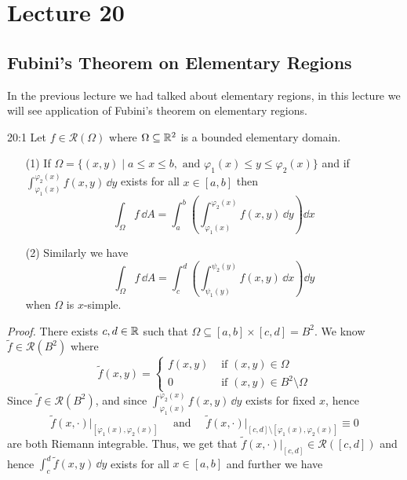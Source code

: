 \documentclass[../Analysis-3.tex]{subfiles}
\begin{document}
\chapter*{Lecture 20} %
\setcounter{chapter}{20} %
\setcounter{section}{0}

\section{Fubini's Theorem on Elementary Regions}

In the previous lecture we had talked about elementary regions, in this lecture we will see application of Fubini's theorem on elementary regions.

\begin{Thm}{}{20:1}
  Let $f \in \mathscr{R}(\Omega)$ where $\Omega \subseteq \mathbb{R}^2$ is a bounded elementary domain.
  \begin{enumerate}
    \item[(1)] If $\Omega = \{ (x,y) \mid a \leq x \leq b, \mbox{ and } \varphi_1(x) \leq y \leq \varphi_2(x) \}$ and if $\displaystyle{\int_{\varphi_1(x)}^{\varphi_2(x)}f(x,y) \, \dd
          y}$ exists for all $x \in [a,b]$ then
      \[
        \int_{\Omega} f \, \dd A = \int_a^b \left( \int_{\varphi_1(x)}^{\varphi_2(x)} f(x,y) \, \dd y\right) \dd x
      \]

    \item[(2)] Similarly we have
      \[
        \int_{\Omega} f \, \dd A = \int_c^d \left( \int_{\psi_1(y)}^{\psi_2(y)} f(x,y) \, \dd x\right) \dd y
      \]
      when $\Omega$ is $x$-simple.
  \end{enumerate}
\end{Thm}
\textit{Proof.} There exists $c,d \in \mathbb{R}$ such that $\Omega \subseteq [a,b] \times [c,d] = B^2$. We know $\tilde{f} \in \mathscr{R}(B^2)$ where
\[
  \tilde{f}(x,y) = \begin{cases}
    f(x,y) & \mbox{ if } (x,y) \in \Omega               \\
    0      & \mbox{ if } (x,y) \in B^2 \setminus \Omega
  \end{cases}
\]
Since $\tilde{f} \in \mathscr{R}(B^2)$, and since $\displaystyle{\int_{\varphi_1(x)}^{\varphi_2(x)} f(x,y) \, \dd y}$ exists for fixed $x$, hence
\[
  \tilde{f}(x,\cdot)\big\vert_{[\varphi_1(x),\varphi_2(x)]} \quad \mbox{ and } \quad \tilde{f}(x,\cdot)\big\vert_{[c,d]\setminus[\varphi_1(x),\varphi_2(x)]} \equiv 0
\]
are both Riemann integrable. Thus, we get that $\tilde{f}(x,\cdot)\vert_{[c,d]} \in \mathscr{R}([c,d])$ and hence $\displaystyle{\int_c^d \tilde{f}(x,y) \, \dd y}$ exists for all $x \in [a,b]$ and further we have
\end{document}
